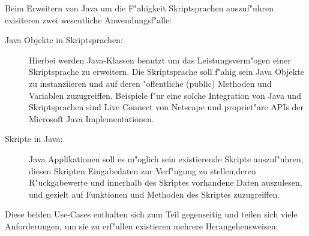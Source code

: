Beim Erweitern von Java um die F"ahigkeit Skriptsprachen auszuf"uhren exisiteren zwei wesentliche Anwendungsf"alle:
\begin{description}
\item[Java Objekte in Skriptsprachen:]
Hierbei werden Java-Klassen benutzt um das Leistungsverm"ogen einer Skriptsprache zu erweitern. Die Skriptsprache
soll f"ahig sein Java Objekte zu instanziieren und auf deren "offentliche (public) Methoden und Variablen 
zuzugreiffen. Beispiele f"ur eine solche Integration von Java und Skriptsprachen sind Live Connect von
Netscape und propriet"are APIs der Microsoft Java Implementationen.
\item[Skripte in Java:]
Java Applikationen soll es m"oglich sein existierende Skripte auszuf"uhren, diesen Skripten Eingabedaten
zur Verf"ugung zu stellen,deren R"uckgabewerte und innerhalb des Skriptes vorhandene Daten auszulesen, 
und gezielt auf Funktionen und Methoden des Skriptes zuzugreiffen.
\end{description}
Diese beiden Use-Cases enthalten sich zum Teil gegenseitig und teilen sich viele Anforderungen, um sie
zu erf"ullen existieren mehrere Herangehensweisen:
